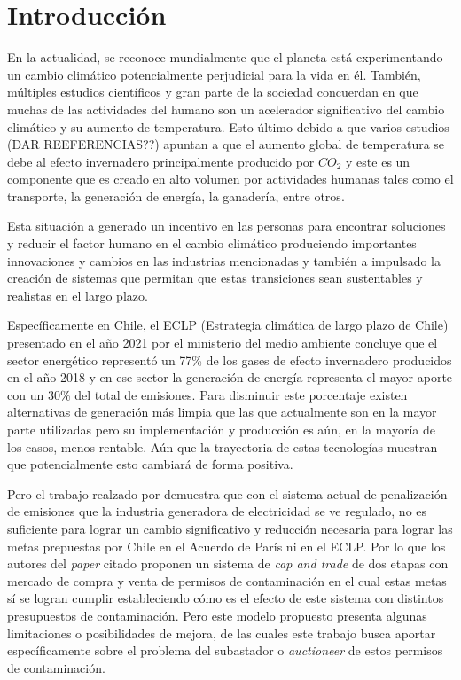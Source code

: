 
\chapter{Introducción}
\label{c1} %

En la actualidad, se reconoce mundialmente que el planeta está experimentando un cambio climático potencialmente perjudicial para la vida en él. También, múltiples estudios científicos y gran parte de la sociedad concuerdan en que muchas de las actividades del humano son un acelerador significativo del cambio climático y su aumento de temperatura. Esto último debido a que varios estudios (DAR REEFERENCIAS??) apuntan a que el aumento global de temperatura se debe al efecto invernadero principalmente producido por $CO_2$ y este es un componente que es creado en alto volumen por actividades humanas tales como el transporte, la generación de energía, la ganadería, entre otros.
\vspace{2.5mm}

Esta situación a generado un incentivo en las personas para encontrar soluciones y reducir el factor humano en el cambio climático produciendo importantes innovaciones y cambios en las industrias mencionadas y también a impulsado la creación de sistemas que permitan que estas transiciones sean sustentables y realistas en el largo plazo. 
\vspace{2.5mm}

Específicamente en Chile, el ECLP  (Estrategia climática de largo plazo de Chile) presentado en el año 2021 por el ministerio del medio ambiente concluye que el sector energético representó un 77\% de los gases de efecto invernadero producidos  en el año 2018 y en ese sector la generación de energía representa el mayor aporte con un 30\% del total de emisiones. Para disminuir este porcentaje existen alternativas de generación más limpia que las que actualmente son en la mayor parte utilizadas pero su implementación y producción es aún, en la mayoría de los casos, menos rentable. Aún que la trayectoria de estas tecnologías muestran que potencialmente esto cambiará de forma positiva.
\vspace{2.5mm}

Pero el trabajo realzado por \cite{amigo_two_2021} demuestra que con el sistema actual de penalización de emisiones que la industria generadora de electricidad se ve regulado, no es suficiente para lograr un cambio significativo y reducción necesaria para lograr las metas prepuestas por Chile en el Acuerdo de París ni en el ECLP. Por lo que los autores del \textit{paper} citado proponen un sistema de \textit{cap and trade} de dos etapas con mercado de compra y venta de permisos de contaminación en el cual estas metas sí se logran cumplir estableciendo cómo es el efecto de este sistema con distintos presupuestos de contaminación. Pero este modelo propuesto presenta algunas limitaciones o posibilidades de mejora, de las cuales este trabajo busca aportar específicamente sobre el problema del subastador o \textit{auctioneer} de estos permisos de contaminación.


